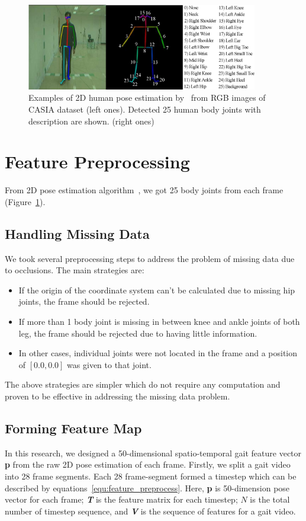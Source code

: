 \begin{figure}
	\centering 
	\includegraphics[width = 0.9\textwidth]{figures/pose_estimation.eps}
	\caption[Examples of 2D human pose estimation from RGB images of CASIA dataset]
	{Examples of 2D human pose estimation by~\cite{Cao_19} from RGB images of CASIA dataset (left ones). Detected 25 human body joints with description are shown. (right ones) \label{fig:pose_estimation}
	}
\end{figure}

\section{Feature Preprocessing}
From 2D pose estimation algorithm~\cite{Cao_19}, we got 25 body joints from each frame (Figure~\ref{fig:pose_estimation}). 

\subsection{Handling Missing Data}
We took several preprocessing steps to address the problem of missing data due to occlusions. The main strategies are: 
\begin{itemize}
\item If the origin of the coordinate system can't be calculated due to missing hip joints, the frame should be rejected.
\item If more than 1 body joint is missing in between knee and ankle joints of both leg, the frame should be rejected due to having little information.
\item In other cases, individual joints were not located in the frame and a position of $[0.0, 0.0]$  was given to that joint. 
\end{itemize}

The above strategies are simpler which do not require any computation and proven to be effective in addressing the missing data problem.

\subsection{Forming Feature Map}
In this research, we designed a 50-dimensional spatio-temporal gait feature vector \textbf{p} from the raw 2D pose estimation of each frame.  Firstly, we split a gait video into 28 frame segments. Each 28 frame-segment formed a timestep which can be described by equations~\ref{equ:feature_preprocess}. Here, \textbf{p} is 50-dimension pose vector for each frame; \textit{\textbf{T}} is the feature matrix for each timestep; $ N $ is the total number of timestep sequence, and \textit{\textbf{V}} is the sequence of features for a gait video. 

